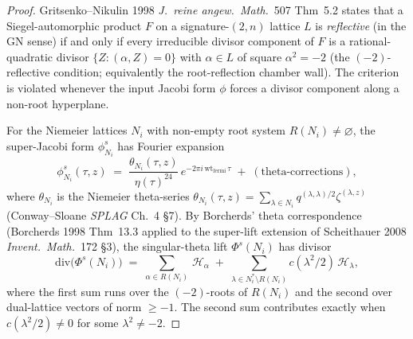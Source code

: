 \begin{proof}
Gritsenko--Nikulin 1998 \emph{J.\ reine angew.\ Math.}~507 Thm~5.2
states that a Siegel-automorphic product $F$ on a signature-$(2,n)$
lattice $L$ is \emph{reflective} (in the GN sense) if and only if
every irreducible divisor component of $F$ is a rational-quadratic
divisor $\{Z : (\alpha, Z) = 0\}$ with $\alpha\in L$ of square
$\alpha^2 = -2$ (the $(-2)$-reflective condition; equivalently the
root-reflection chamber wall). The criterion is violated whenever the
input Jacobi form $\phi$ forces a divisor component along a
non-root hyperplane.

For the Niemeier lattices $N_i$ with non-empty root system
$R(N_i)\ne\varnothing$, the super-Jacobi form $\phi^s_{N_i}$ has
Fourier expansion
\[
 \phi^s_{N_i}(\tau, z)
 \;=\;
 \frac{\theta_{N_i}(\tau, z)}{\eta(\tau)^{24}}\,
 e^{-2\pi i\,\mathrm{wt}_{\mathrm{fermi}}\,\tau}
 \;+\; (\text{theta-corrections}),
\]
where $\theta_{N_i}$ is the Niemeier theta-series
$\theta_{N_i}(\tau, z) = \sum_{\lambda\in N_i} q^{(\lambda,\lambda)/2}
\zeta^{(\lambda, z)}$ (Conway--Sloane \emph{SPLAG} Ch.~4 \S7). By
Borcherds' theta correspondence (Borcherds 1998 Thm~13.3 applied to
the super-lift extension of Scheithauer 2008 \emph{Invent.\ Math.}~172
\S3), the singular-theta lift $\Phi^s(N_i)$ has divisor
\[
 \mathrm{div}\bigl(\Phi^s(N_i)\bigr)
 \;=\;
 \sum_{\alpha\in R(N_i)}\,\mathcal H_\alpha
 \;+\;
 \sum_{\lambda\in N_i^*\setminus R(N_i)}
 c(\lambda^2/2)\,\mathcal H_\lambda,
\]
where the first sum runs over the $(-2)$-roots of $R(N_i)$ and the
second over dual-lattice vectors of norm $\ge -1$. The second sum
contributes exactly when $c(\lambda^2/2)\ne 0$ for some
$\lambda^2\ne -2$.


\end{proof}
